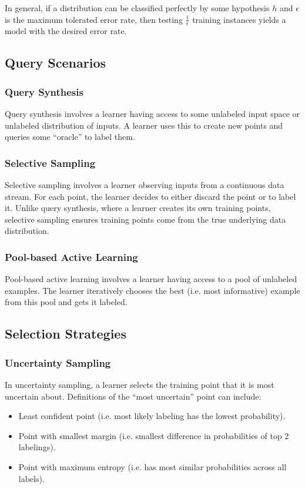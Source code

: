 \documentclass[12pt,titlepage]{article}
\begin{document}
    In general, if a distribution can be classified perfectly by some hypothesis $h$ and $\epsilon$ is the maximum tolerated error rate, then testing
    $\frac{1}{\epsilon}$ training instances yields a model with the desired error rate.

    \subsection{Query Scenarios}

      \subsubsection{Query Synthesis}
        Query synthesis involves a learner having access to some unlabeled input space or unlabeled distribution of inputs. A learner uses this to create
        new points and queries some ``oracle'' to label them.

      \subsubsection{Selective Sampling}
        Selective sampling involves a learner observing inputs from a continuous data stream. For each point, the learner decides to either discard the
        point or to label it. Unlike query synthesis, where a learner creates its own training points, selective sampling ensures training points come from
        the true underlying data distribution.

      \subsubsection{Pool-based Active Learning}
        Pool-based active learning involves a learner having access to a pool of unlabeled examples. The learner iteratively chooses the best (i.e. most informative)
        example from this pool and gets it labeled.

    \subsection{Selection Strategies}

      \subsubsection{Uncertainty Sampling}
        In uncertainty sampling, a learner selects the training point that it is most uncertain about. Definitions of the ``most uncertain'' point can include:
        \begin{itemize}
          \item Least confident point (i.e. most likely labeling has the lowest probability).
          \item Point with smallest margin (i.e. smallest difference in probabilities of top 2 labelings).
          \item Point with maximum entropy (i.e. has most similar probabilities across all labels).
        \end{itemize}
\end{document}
